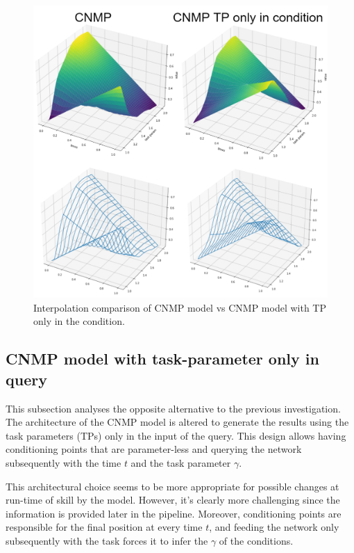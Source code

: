 \begin{figure}
    \centering
    \includegraphics[width=0.8\linewidth]{figures/comparisonCNMPvsCNMPonlyTPcondition.png}
    \caption{ Interpolation comparison of CNMP model vs CNMP model with TP only in the condition. }
    \label{fig:comparisonCNMPvsCNMPonlyTPcondition}
\end{figure}



\subsection{CNMP model with task-parameter only in query}
This subsection analyses the opposite alternative to the previous investigation. The architecture of the CNMP model is altered to generate the results using the task parameters (TPs) only in the input of the query. This design allows having conditioning points that are parameter-less and querying the network subsequently with the time $t$ and the task parameter $\gamma$. 

This architectural choice seems to be more appropriate for possible changes at run-time of skill by the model. However, it's clearly more challenging since the information is provided later in the pipeline. Moreover, conditioning points are responsible for the final position at every time $t$, and feeding the network only subsequently with the task forces it to infer the $\gamma$ of the conditions. 

